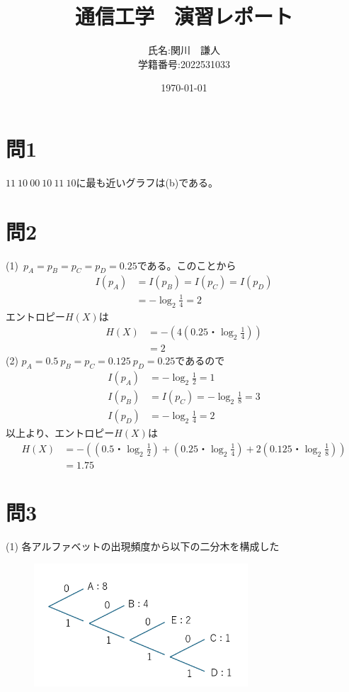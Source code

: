 \documentclass[a4paper,11pt]{ltjsarticle}
\begin{document}
\title{通信工学　演習レポート}
\author{氏名:関川　謙人\\学籍番号:2022531033}
\date{\today}
\maketitle

\section*{問1}
$11 \ 10 \ 00 \ 10 \ 11 \ 10$に最も近いグラフは(b)である。
\section*{問2}
(1)\ $p_{A}=p_{B}=p_{C}=p_{D}= 0.25 $である。このことから
\begin{align*}
  I(p_{A}) &= I(p_{B}) = I(p_{C}) = I(p_{D}) \\ 
  &= -\log_{2}\frac{1}{4} = 2
\end{align*}
エントロピー$H(X)$は
\begin{align*}
  H(X) &= -(4(0.25・\log_{2}\frac{1}{4})) \\
       &= 2
\end{align*}
(2)
$p_{A}= 0.5 \ p_{B}=p_{C}=0.125 \ p_{D}= 0.25$であるので
\begin{align*}
  I(p_{A}) &= -\log_{2}\frac{1}{2} = 1 \\
  I(p_{B}) &= I(p_{C}) = -\log_{2}\frac{1}{8} = 3 \\
  I(p_{D}) &= -\log_{2}\frac{1}{4} = 2
\end{align*}
以上より、エントロピー$H(X)$は
\begin{align*}
  H(X) &= -((0.5・\log_{2}\frac{1}{2})+(0.25・\log_{2}\frac{1}{4})+2(0.125・\log_{2}\frac{1}{8})) \\
       &= 1.75
\end{align*}
\section*{問3}
(1)
各アルファベットの出現頻度から以下の二分木を構成した
\begin{figure}[h]
\begin{center}
\includegraphics*[width = 8cm]{tuushin1.png}
\end{center}
\end{figure}
\end{document}
